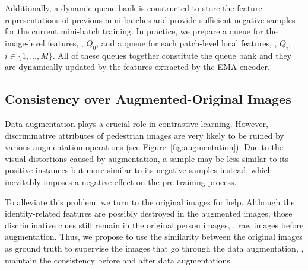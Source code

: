 \documentclass[10pt,twocolumn,letterpaper]{article}
\begin{document}
Additionally, a dynamic queue bank is constructed to store the feature representations of previous mini-batches and provide sufficient negative samples for the current mini-batch training. In practice, we prepare a queue for the image-level features, \ie, ${Q}_{0}$, and a queue for each patch-level local features, \ie, ${Q}_{i}$, $i\in\{1,...,M\}$. All of these queues together constitute the queue bank and they are dynamically updated by the features extracted by the EMA encoder.



\subsection{Consistency over Augmented-Original Images}
\label{section: consistency constraint}

Data augmentation plays a crucial role in contrastive learning. However, discriminative attributes of pedestrian images are very likely to be ruined by various augmentation operations (see Figure~\ref{fig:augmentation}). Due to the visual distortions caused by augmentation, a sample may be less similar to its positive instances but more similar to its negative samples instead, which inevitably imposes a negative effect on the pre-training process. 


To alleviate this problem, we turn to the original images for help. Although the identity-related features are possibly destroyed in the augmented images, those discriminative clues still remain in the original person images, \ie, raw images before augmentation. Thus, we propose to use the similarity between the original images as ground truth to supervise the images that go through the data augmentation, \ie, maintain the consistency before and after data augmentations.
\end{document}
